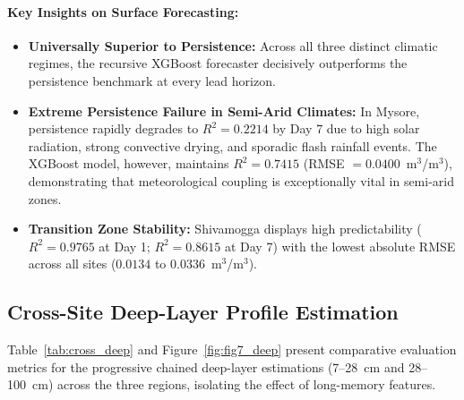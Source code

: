 \documentclass[12pt, a4paper]{article}
\begin{document}
\paragraph{Key Insights on Surface Forecasting:}
\begin{itemize}
    \item \textbf{Universally Superior to Persistence:} Across all three distinct climatic regimes, the recursive XGBoost forecaster decisively outperforms the persistence benchmark at every lead horizon.
    \item \textbf{Extreme Persistence Failure in Semi-Arid Climates:} In Mysore, persistence rapidly degrades to $R^2 = 0.2214$ by Day 7 due to high solar radiation, strong convective drying, and sporadic flash rainfall events. The XGBoost model, however, maintains $R^2 = 0.7415$ (RMSE $= 0.0400$~m$^3$/m$^3$), demonstrating that meteorological coupling is exceptionally vital in semi-arid zones.
    \item \textbf{Transition Zone Stability:} Shivamogga displays high predictability ($R^2 = 0.9765$ at Day 1; $R^2 = 0.8615$ at Day 7) with the lowest absolute RMSE across all sites ($0.0134$ to $0.0336$~m$^3$/m$^3$).
\end{itemize}

\subsection{Cross-Site Deep-Layer Profile Estimation}

Table~\ref{tab:cross_deep} and Figure~\ref{fig:fig7_deep} present comparative evaluation metrics for the progressive chained deep-layer estimations (7--28~cm and 28--100~cm) across the three regions, isolating the effect of long-memory features.
\end{document}
